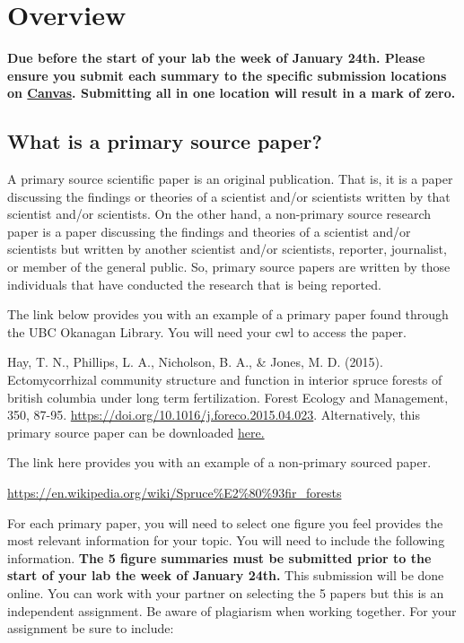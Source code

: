 \documentclass[
]{book}
\begin{document}
\hypertarget{overview}{%
\section*{Overview}\label{overview}}

\textbf{Due before the start of your lab the week of January 24th. Please ensure you submit each summary to the specific submission locations on \href{https://canvas.ubc.ca/courses/113910}{Canvas}. Submitting all in one location will result in a mark of zero.}

\hypertarget{what-is-a-primary-source-paper}{%
\subsection*{What is a primary source paper?}\label{what-is-a-primary-source-paper}}

A primary source scientific paper is an original publication. That is, it is a paper discussing the findings or theories of a scientist and/or scientists written by that scientist and/or scientists. On the other hand, a non-primary source research paper is a paper discussing the findings and theories of a scientist and/or scientists but written by another scientist and/or scientists, reporter, journalist, or member of the general public. So, primary source papers are written by those individuals that have conducted the research that is being reported.

The link below provides you with an example of a primary paper found through the UBC Okanagan Library. You will need your cwl to access the paper.

Hay, T. N., Phillips, L. A., Nicholson, B. A., \& Jones, M. D. (2015). Ectomycorrhizal community structure and function in interior spruce forests of british columbia under long term fertilization. Forest Ecology and Management, 350, 87-95. \url{https://doi.org/10.1016/j.foreco.2015.04.023}. Alternatively, this primary source paper can be downloaded \href{files/primary_source_paper_example.pdf}{here.}

The link here provides you with an example of a non-primary sourced paper.

\url{https://en.wikipedia.org/wiki/Spruce\%E2\%80\%93fir_forests}

For each primary paper, you will need to select one figure you feel provides the most relevant information for your topic. You will need to include the following information. \textbf{The 5 figure summaries must be submitted prior to the start of your lab the week of January 24th.} This submission will be done online. You can work with your partner on selecting the 5 papers but this is an independent assignment. Be aware of plagiarism when working together. For your assignment be sure to include:
\end{document}
